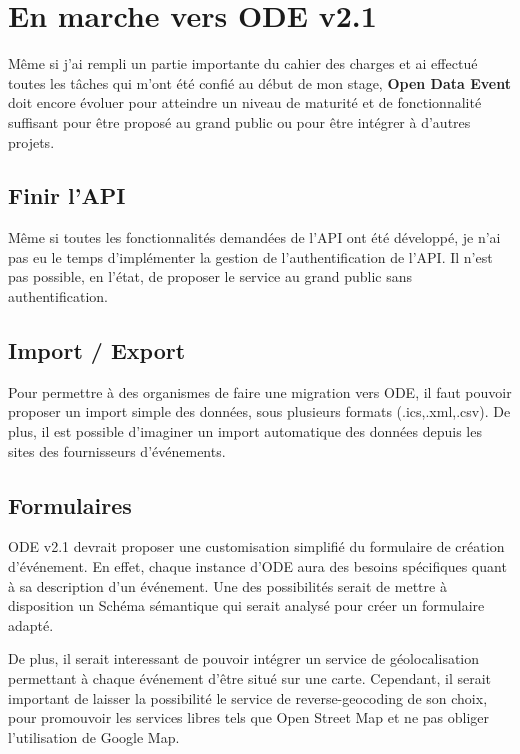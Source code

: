 \section{En marche vers ODE v2.1}

Même si j'ai rempli un partie importante du cahier des charges et ai effectué toutes les tâches qui m'ont été confié au début de mon stage, \textbf{Open Data Event} doit encore évoluer pour atteindre un niveau de maturité et de fonctionnalité suffisant pour être proposé au grand public ou pour être intégrer à d'autres projets.

\subsection{Finir l'API}

Même si toutes les fonctionnalités demandées de l'API ont été développé, je n'ai pas eu le temps d'implémenter la gestion de l'authentification de l'API. Il n'est pas possible, en l'état, de proposer le service au grand public sans authentification.

\subsection{Import / Export}

Pour permettre à des organismes de faire une migration vers ODE, il faut pouvoir proposer un import simple des données, sous plusieurs formats (.ics,.xml,.csv). De plus, il est possible d'imaginer un import automatique des données depuis les sites des fournisseurs d'événements.

\subsection{Formulaires}

ODE v2.1 devrait proposer une customisation simplifié du formulaire de création d'événement. En effet, chaque instance d'ODE aura des besoins spécifiques quant à sa description d'un événement.
Une des possibilités serait de mettre à disposition un Schéma sémantique qui serait analysé pour créer un formulaire adapté.

De plus, il serait interessant de pouvoir intégrer un service de géolocalisation permettant à chaque événement d'être situé sur une carte. Cependant, il serait important de laisser la possibilité le service de reverse-geocoding de son choix, pour promouvoir les services libres tels que Open Street Map et ne pas obliger l'utilisation de Google Map.

